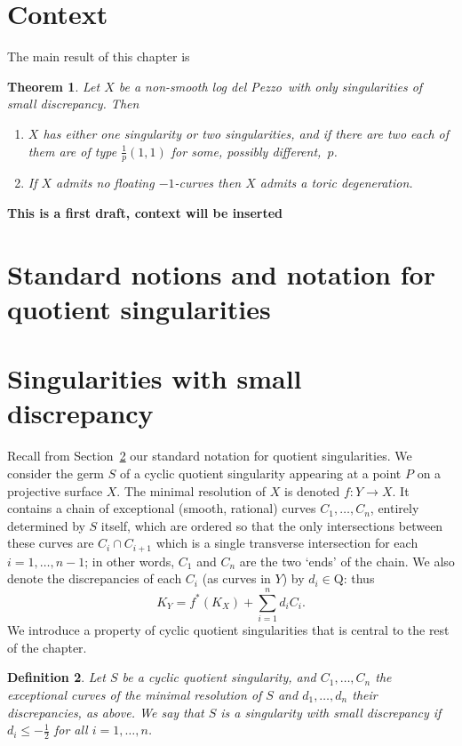 \documentclass[11pt]{amsbook}
\theoremstyle{plain}
\newtheorem{thm}{Theorem}[section]
\newtheorem{dfn}[thm]{Definition}
\newcommand{\ldp}{log del Pezzo}
\newcommand{\Q}{\mathrm{Q}}
\begin{document}
 

\setcounter{chapter}{2}

\section{Context}
The main result of this chapter is 
\begin{thm}\label{ThmOnSing}
Let $X$ be a non-smooth \ldp\ with only singularities of small discrepancy. Then 
\begin{enumerate}
\item\label{thm38i}
$X$ has either one singularity or two singularities, and if there are two each of them are of type $\frac{1}p(1,1)$ for some, possibly different,~$p$.
\item\label{thm38ii}
If $X$ admits no floating $-1$-curves then $X$ admits a toric degeneration. %
\end{enumerate}
\end{thm}
\textbf{This is a first draft, context will be inserted}

\section{Standard notions and notation for quotient singularities}
\label{sec!notation}

\section{Singularities with small discrepancy}

Recall from Section~\ref{sec!notation} our standard notation for quotient singularities.
We consider the germ $S$ of a cyclic quotient singularity appearing at a point $P$ on a 
projective surface $X$.
The minimal resolution of $X$ is denoted $f\colon Y \longrightarrow X$. It contains a chain of
exceptional (smooth, rational)
curves $C_1,\dots,C_n$, entirely determined by $S$ itself, which are ordered so
that the only intersections between these curves are
$C_i\cap C_{i+1}$ which is a single transverse intersection for each $i=1,\dots,n-1$; 
in other words,
$C_1$ and $C_n$ are the two `ends' of the chain.
We also denote the discrepancies of each $C_i$ (as curves in $Y$) by $d_i\in\Q$: thus
\[
K_Y = f^*(K_X) + \sum_{i=1}^n d_i C_i.
\]
We introduce a property of cyclic quotient singularities that is central to the rest of the chapter.
\begin{dfn}
Let $S$ be a cyclic quotient singularity, and $C_1, \dots ,C_n$ the exceptional curves of the minimal resolution of $S$ and $d_1, \dots,d_n$ their discrepancies, as above.
We say that $S$ is a \emph{singularity with small discrepancy} if $d_i \leq -\frac{1}{2}$ for
all $i=1,\dots,n$.
\end{dfn}
\end{document}
